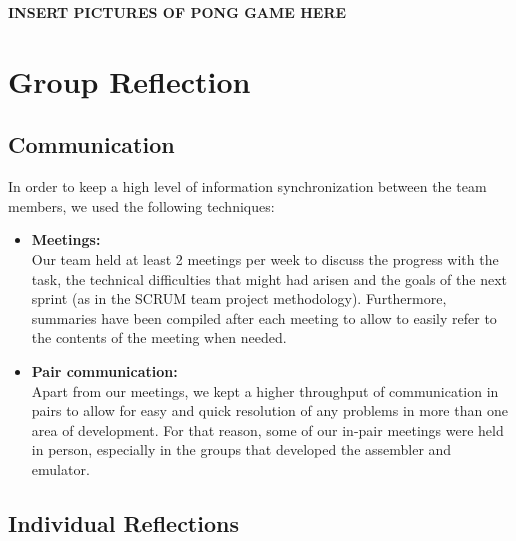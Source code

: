 \documentclass[11pt]{article}
\begin{document}
\centerline{\textbf{INSERT PICTURES OF PONG GAME HERE}}
\section{Group Reflection}
\subsection*{Communication}
In order to keep a high level of information synchronization between the team members, we used the following techniques:
\begin{itemize}
\item \textbf{Meetings:}\\
Our team held at least 2 meetings per week to discuss the progress with the task, the technical difficulties that might had arisen and the goals of the next sprint (as in the SCRUM team project methodology). Furthermore, summaries have been compiled after each meeting to allow to easily refer to the contents of the meeting when needed. 
\item \textbf{Pair communication:}\\
Apart from our meetings, we kept a higher throughput of communication in pairs to allow for easy and quick resolution of any problems in more than one area of development. For that reason, some of our in-pair meetings were held in person, especially in the groups that developed the assembler and emulator.
\end{itemize}
\subsection*{Individual Reflections}
\end{document}
